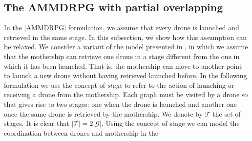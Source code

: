 \subsection{The AMMDRPG with partial overlapping }\label{amdasyn}
\color{blue}
\noindent
In the \eqref{AMMDRPG} formulation, we assume that every drone is launched and retrieved in the same stage. In this subsection, we show how this assumption can be relaxed.
We consider a variant of the model presented in , in which we assume that the mothership can retrieve one drone in a stage different from the one in which it has been launched. That is, the mothership can move to another point to launch a new drone without having  retrieved  launched before.
\noindent
In the following formulation we use the concept of \textit{stage} to refer to the action of launching or receiving a drone from the mothership. Each graph must be visited by a drone so that  gives rise to two stages: one when the drone is launched and another one once the same drone is retrieved by the mothership. We denote by $\mathcal{T}$ the set of stages. It is clear that $|\mathcal{T}|=2|\mathcal{G}|$. Using the concept of stage we can  model the coordination between drones and mothership in the  

